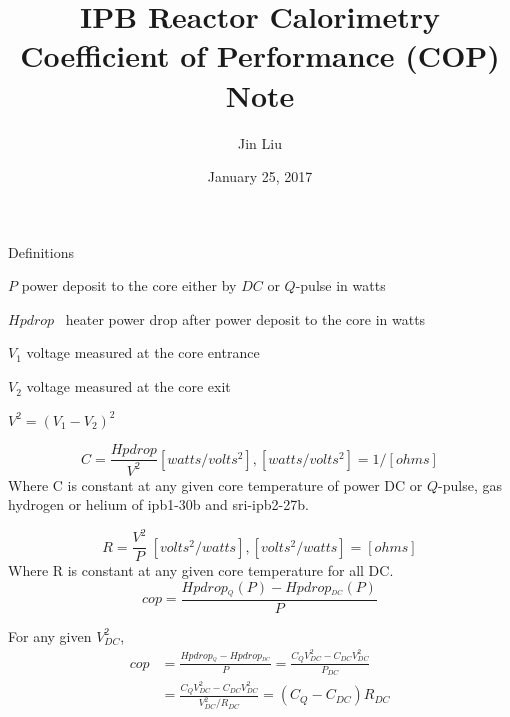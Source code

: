 \documentclass{article}%
\begin{document}
\title{IPB Reactor Calorimetry Coefficient of Performance (COP) Note}
\author{Jin Liu }
\date{January 25, 2017}
\maketitle

Definitions

$P$ power deposit to the core either by $DC$ or $Q$-pulse in watts

$Hpdrop$ \ heater power drop after power deposit to the core in watts

$V_{1}$ voltage measured at the core entrance

$V_{2}$ voltage measured at the core exit

$V^{2}=(V_{1}-V_{2})^{2}$%


\begin{equation}
C=\frac{Hpdrop}{V^{2}}[watts/volts^{2}], [watts/volts^{2}] = 1/[ohms] \label{1}%
\end{equation}
%
Where C is constant at any given core temperature of power DC or $Q$-pulse, gas hydrogen or helium of ipb1-30b and sri-ipb2-27b. 
 
\begin{equation}
R=\frac{V^{2}}{P}\ [volts^{2}/watts], [volts^{2}/watts]=[ohms]\label{2}%
\end{equation}
%
Where R is constant at any given core temperature for all DC.
\begin{equation}
cop=\frac{Hpdrop_{^{Q}}(P)-Hpdrop_{^{DC}}(P)}{P}\label{3}%
\end{equation}


For any given $V_{DC}^{2}$,
\begin{align}
cop & =\frac{Hpdrop_{^{Q}}-Hpdrop_{^{DC}}}{P}=\frac{C_{Q}V_{DC}^{2}%
-C_{DC}V_{DC}^{2}}{P_{DC}}\nonumber\\
& =\frac{C_{Q}V_{DC}^{2}-C_{DC}V_{DC}^{2}}{V_{DC}^{2}/R_{DC}}=\left(
C_{Q}-C_{DC}\right)  R_{DC}\label{5}%
\end{align}
\end{document}
